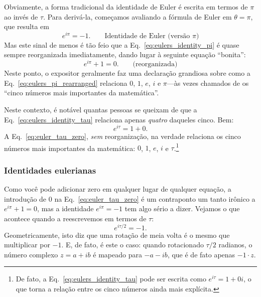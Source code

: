 Obviamente, a forma tradicional da identidade de Euler é escrita em termos de $\pi$ ao invés de $\tau$. Para derivá-la, começamos avaliando a fórmula de Euler em $\theta = \pi$, que resulta em
\begin{equation}
\label{eq:eulers_identity_pi}
e^{i\pi} = -1. \qquad\mbox{Identidade de Euler (versão $\pi$)}
\end{equation}
Mas este sinal de menos é tão feio que a Eq.~\eqref{eq:eulers_identity_pi} é quase sempre reorganizada imediatamente, dando lugar à seguinte equação ``bonita'':
\begin{equation}
\label{eq:eulers_pi_rearranged}
e^{i\pi} + 1 = 0. \qquad\mbox{(reorganizada)}
\end{equation}
Neste ponto, o expositor geralmente faz uma declaração grandiosa sobre como a Eq.~\eqref{eq:eulers_pi_rearranged} relaciona $0$, $1$, $e$, $i$ e $\pi$---às vezes chamados de os ``cinco números mais importantes da matemática''.

Neste contexto, é notável quantas pessoas se queixam de que a Eq.~\eqref{eq:eulers_identity_tau} relaciona apenas \emph{quatro} daqueles cinco. Bem:
\begin{equation}
\label{eq:euler_tau_zero}
e^{i\tau} = 1 + 0.
\end{equation}
A Eq.~\eqref{eq:euler_tau_zero}, \emph{sem} reorganização, na verdade relaciona os cinco números mais importantes da matemática: $0$, $1$, $e$, $i$ e $\tau$.\footnote{De fato, a Eq.~\eqref{eq:eulers_identity_tau} pode ser escrita como $e^{i\tau} = 1 + 0i$, o que torna a relação entre os cinco números ainda mais explícita.}

      \subsubsection{Identidades eulerianas} %
      \label{sec:eulerian_identities}

Como você pode adicionar zero em qualquer lugar de qualquer equação, a introdução de $0$ na Eq.~\eqref{eq:euler_tau_zero} é um contraponto um tanto irônico a $e^{i\pi} + 1 = 0$, mas a identidade $e^{i\pi} = -1$ tem algo sério a dizer. Vejamos o que acontece quando a reescrevemos em termos de $\tau$:
\[
e^{i\tau/2} = -1.
\]
Geometricamente, isto diz que uma rotação de meia volta é o mesmo que multiplicar por $-1$. E, de fato, é este o caso: quando rotacionado $\tau/2$ radianos, o número complexo $z = a + ib$ é mapeado para $-a - ib$, que é de fato apenas $-1\cdot z$.

